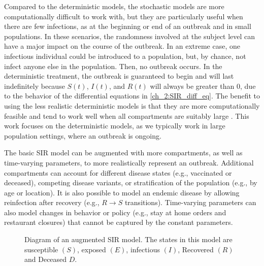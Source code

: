 Compared to the deterministic models, the stochastic models are more computationally difficult to work with, but they are particularly useful when there are few infections, as at the beginning or end of an outbreak and in small populations.
In these scenarios, the randomness involved at the subject level can have a major impact on the course of the outbreak.
In an extreme case, one infectious individual could be introduced to a population, but, by chance, not infect anyone else in the population.
Then, no outbreak occurs.
In the deterministic treatment, the outbreak is guaranteed to begin and will last indefinitely because \( S(t) \), \(  I(t) \), and \( R(t) \) will always be greater than 0, due to the behavior of the differential equations in \eqref{ch_2:SIR_diff_eq}.
The benefit to using the less realistic deterministic models is that they are more computationally feasible and tend to work well when all compartments are suitably large \citep{doi:10.1098/rspb.2015.0347}.
This work focuses on the deterministic models, as we typically work in large population settings, where an outbreak is ongoing.

The basic SIR model can be augmented with more compartments, as well as time-varying parameters, to more realistically represent an outbreak.
Additional compartments can account for different disease states (e.g., vaccinated or deceased), competing disease variants, or stratification of the population (e.g., by age or location).
It is also possible to model an endemic disease by allowing reinfection after recovery (e.g., \(R \to S\) transitions).
Time-varying parameters can also model changes in behavior or policy (e.g., stay at home orders and restaurant closures) that cannot be captured by the constant parameters.

\begin{figure}
    \centering
    \caption{Diagram of an augmented SIR model.
    The states in this model are susceptible \( (S) \), exposed \( (E) \), infectious \( (I) \), Recovered \( (R) \) and Deceased \( D \).}
    \label{ch_2:fig:SEIRDS_diagram}
\end{figure}

